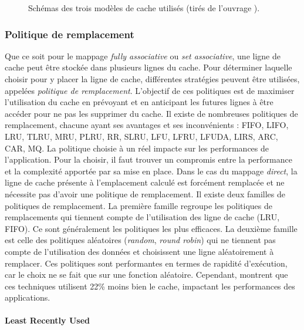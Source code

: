 \begin{figure}
                \caption{Schémas des trois modèles de cache utilisés (tirés de l'ouvrage \cite{Blanchet2013}).}\label{fig:cache_schema}
            \end{figure}
        
                
    
            
    
        
        \fi

    \subsubsection{Politique de remplacement}

        Que ce soit pour le mappage \textit{fully associative} ou \textit{set associative}, une ligne de cache peut être stockée dans plusieurs lignes du cache. Pour déterminer laquelle choisir pour y placer la ligne de cache, différentes stratégies peuvent être utilisées, appelées \textit{politique de remplacement}. L'objectif de ces politiques est de maximiser l'utilisation du cache en prévoyant et en anticipant les futures lignes à être accéder pour ne pas les supprimer du cache. Il existe de nombreuses politiques de remplacement, chacune ayant ses avantages et ses inconvénients \cite{wikipedia2_2019}: FIFO, LIFO, LRU, TLRU, MRU, PLRU, RR, SLRU, LFU, LFRU, LFUDA, LIRS, ARC, CAR, MQ. La politique choisie à un réel impacte sur les performances de l'application. Pour la choisir, il faut trouver un compromis entre la performance et la complexité apportée par sa mise en place. Dans le cas du mappage \textit{direct}, la ligne de cache présente à l'emplacement calculé est forcément remplacée et ne nécessite pas d'avoir une politique de remplacement. Il existe deux familles de politiques de remplacement. La première famille regroupe les politiques de remplacements qui tiennent compte de l'utilisation des ligne de cache (LRU, FIFO). Ce sont généralement les politiques les plus efficaces. La deuxième famille est celle des politiques aléatoires (\textit{random}, \textit{round robin}) qui ne tiennent pas compte de l'utilisation des données et choisissent une ligne aléatoirement à remplacer. Ces politiques sont performantes en termes de rapidité d'exécution, car le choix ne se fait que sur une fonction aléatoire. Cependant, \cite{Al-Zoubi:2004:PEC:986537.986601} montrent que ces techniques utilisent 22\% moins bien le cache, impactant les performances des applications.
        
        
        \paragraph{Least Recently Used} 
        

